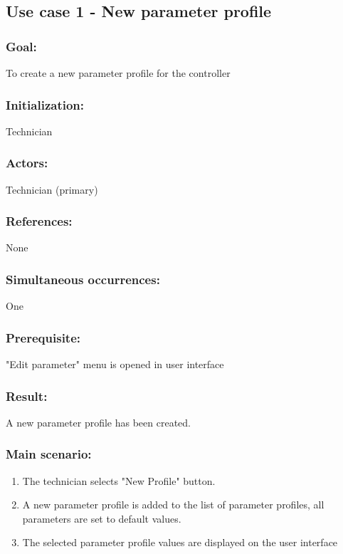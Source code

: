 \begin{framed}
\subsection{Use case 1 - New parameter profile}
\subsubsection*{Goal:}
To create a new parameter profile for the controller

\subsubsection*{Initialization:}
Technician

\subsubsection*{Actors:}
Technician (primary)

\subsubsection*{References:}
None

\subsubsection*{Simultaneous occurrences:}
One

\subsubsection*{Prerequisite:}
"Edit parameter" menu is opened in user interface

\subsubsection*{Result:}
A new parameter profile has been created.

\subsubsection*{Main scenario:}
\begin{enumerate}
	\item The technician selects "New Profile" button.
	\item A new parameter profile is added to the list of parameter profiles, all parameters are set to default values.
	\item The selected parameter profile values are displayed on the user interface
\end{enumerate}	
\end{framed}

